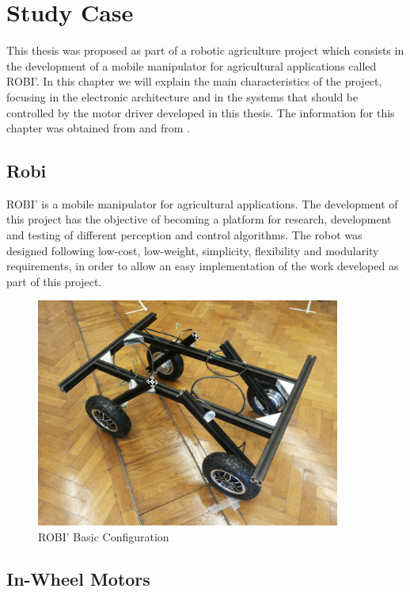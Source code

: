 \chapter{Study Case} \label{chap:robi}

This thesis was proposed as part of a robotic agriculture project which consists in the development of a mobile manipulator for agricultural applications called ROBI'. In this chapter we will explain the main characteristics of the project, focusing in the electronic architecture and in the systems that should be controlled by the motor driver developed in this thesis. The information for this chapter was obtained from \citeauthor{robi:2017}  \citeyear{robi:2017} and from \citeauthor{robi2:2017}  \citeyear{robi2:2017}.

\section{Robi}

ROBI' is a mobile manipulator for agricultural applications. The development of this project has the objective of becoming a platform for research, development and testing of different perception and control algorithms. The robot was designed following low-cost, low-weight, simplicity, flexibility and modularity requirements, in order to allow an easy implementation of the work developed as part of this project.

\begin{figure}[htbp]
\centering
\includegraphics[width=10cm]{Images/robi.png} 
\caption[ROBI' Basic Configuration]{ROBI' Basic Configuration}
\label{fig:robi_picture}
\end{figure}

\section{In-Wheel Motors}

